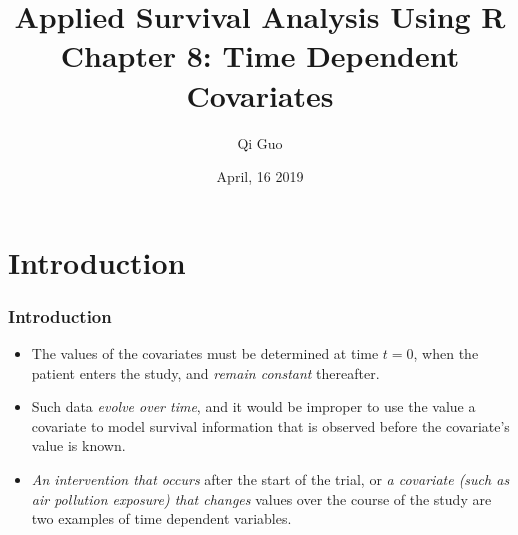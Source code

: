 \documentclass{beamer}
\title[Survival Analysis]{Applied Survival Analysis Using R\\ Chapter 8: Time Dependent Covariates}
\author[Qi Guo]{Qi Guo}
\institute[UTD]{Department of Mathematical Sciences \\ 
	The University of Texas at Dallas}
\date{April, 16 2019}
\newcommand{\empr}[1]{{\emph{\color{red}#1}}}
\begin{document}
\begin{frame}
  \titlepage
\end{frame}

\bgroup
{}


\section[Outline]{}
\begin{frame}
  \tableofcontents
\end{frame}

\section{Introduction}
\begin{frame}
\frametitle{Introduction}
\begin{itemize}
\item The values of the covariates must be determined at time $t=0$, when the patient enters the study, and \empr{remain constant} thereafter.
\item  Such data \empr{evolve over time}, and it would be improper to use the value a covariate to model survival information that is observed before the covariate's value is known.
\item \empr{An intervention that occurs} after the start of the trial, or \empr{a covariate (such as air pollution exposure) that changes} values over the course of the study are two examples of time dependent variables.
\end{itemize}
\end{frame}
\end{document}

